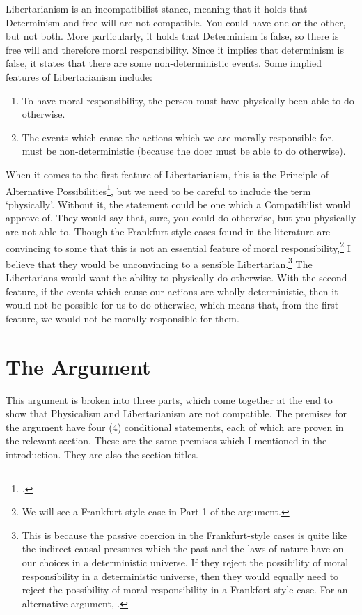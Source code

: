 Libertarianism is an incompatibilist stance, meaning that it holds that Determinism and free will are not compatible. You could have one or the other, but not both. More particularly, it holds that Determinism is false, so there is free will and therefore moral responsibility. Since it implies that determinism is false, it states that there are some non-deterministic events. Some implied features of Libertarianism include:
\begin{enumerate}
    \item To have moral responsibility, the person must have physically been able to do otherwise.
    \item The events which cause the actions which we are morally responsible for, must be non-deterministic (because the doer must be able to do otherwise).
\end{enumerate}
When it comes to the first feature of Libertarianism, this is the Principle of Alternative Possibilities\footnote{\cite{Frankfurt1}.}, but we need to be careful to include the term ‘physically'. Without it, the statement could be one which a Compatibilist would approve of. They would say that, sure, you could do otherwise, but you physically are not able to. Though the Frankfurt-style cases found in the literature are convincing to some that this is not an essential feature of moral responsibility,\footnote{We will see a Frankfurt-style case in Part 1 of the argument.} I believe that they would be unconvincing to a sensible Libertarian.\footnote{This is because the passive coercion in the Frankfurt-style cases is quite like the indirect causal pressures which the past and the laws of nature have on our choices in a deterministic universe. If they reject the possibility of moral responsibility in a deterministic universe, then they would equally need to reject the possibility of moral responsibility in a Frankfort-style case. For an alternative argument, \cite[see][ ]{Widerker1}.} The Libertarians would want the ability to physically do otherwise. With the second feature, if the events which cause our actions are wholly deterministic, then it would not be possible for us to do otherwise, which means that, from the first feature, we would not be morally responsible for them.
\section{The Argument}

This argument is broken into three parts, which come together at the end to show that Physicalism and Libertarianism are not compatible. The premises for the argument have four (4) conditional statements, each of which are proven in the relevant section. These are the same premises which I mentioned in the introduction. They are also the section titles.
